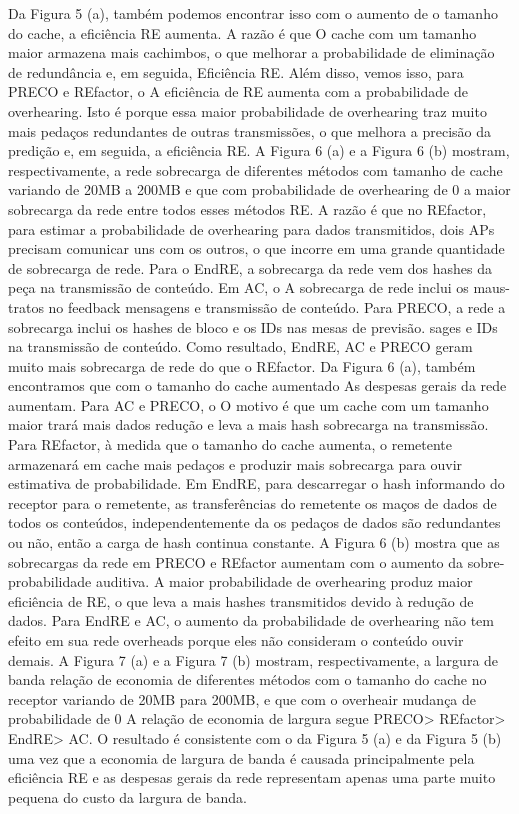 \documentclass[12pt]{article}
\begin{document}
\begin{enumerate}
\begin{enumerate}
		Da Figura 5 (a), também podemos encontrar isso com o aumento de
		o tamanho do cache, a eficiência RE aumenta. A razão é que
		O cache com um tamanho maior armazena mais cachimbos, o que
		melhorar a probabilidade de eliminação de redundância e, em seguida,
		Eficiência RE. Além disso, vemos isso, para PRECO e REfactor, o
		A eficiência de RE aumenta com a probabilidade de overhearing. Isto é
		porque essa maior probabilidade de overhearing traz muito mais
		pedaços redundantes de outras transmissões, o que melhora
		a precisão da predição e, em seguida, a eficiência RE.
		A Figura 6 (a) e a Figura 6 (b) mostram, respectivamente, a rede
		sobrecarga de diferentes métodos com tamanho de cache variando de
		20MB a 200MB e que com probabilidade de overhearing
		de 0%
		a maior sobrecarga da rede entre todos esses métodos RE.
		A razão é que no REfactor, para estimar a
		probabilidade de overhearing para dados transmitidos, dois APs precisam
		comunicar uns com os outros, o que incorre em uma grande quantidade de
		sobrecarga de rede. Para o EndRE, a sobrecarga da rede vem dos hashes da peça na transmissão de conteúdo. Em AC, o
		A sobrecarga de rede inclui os maus-tratos no feedback
		mensagens e transmissão de conteúdo. Para PRECO, a rede
		a sobrecarga inclui os hashes de bloco e os IDs nas mesas de previsão.
		sages e IDs na transmissão de conteúdo. Como resultado, EndRE, AC
		e PRECO geram muito mais sobrecarga de rede do que o REfactor.
		Da Figura 6 (a), também encontramos que com o tamanho do cache aumentado
		As despesas gerais da rede aumentam.
		Para AC e PRECO, o
		O motivo é que um cache com um tamanho maior trará mais dados
		redução e leva a mais hash sobrecarga na transmissão.
		Para REfactor, à medida que o tamanho do cache aumenta, o remetente armazenará em cache
		mais pedaços e produzir mais sobrecarga para ouvir
		estimativa de probabilidade. Em EndRE, para descarregar o hash
		informando do receptor para o remetente, as transferências do remetente
		os maços de dados de todos os conteúdos, independentemente da
		os pedaços de dados são redundantes ou não, então a carga de hash continua
		constante. A Figura 6 (b) mostra que as sobrecargas da rede em
		PRECO e REfactor aumentam com o aumento da sobre-
		probabilidade auditiva. A maior probabilidade de overhearing produz
		maior eficiência de RE, o que leva a mais hashes transmitidos
		devido à redução de dados. Para EndRE e AC, o aumento
		da probabilidade de overhearing não tem efeito em sua rede
		overheads porque eles não consideram o conteúdo ouvir demais.
		A Figura 7 (a) e a Figura 7 (b) mostram, respectivamente, a largura de banda
		relação de economia de diferentes métodos com o tamanho do cache no receptor
		variando de 20MB para 200MB, e que com o overheair
		mudança de probabilidade de 0%
		A relação de economia de largura segue PRECO> REfactor> EndRE> AC.
		O resultado é consistente com o da Figura 5 (a) e da Figura 5 (b)
		uma vez que a economia de largura de banda é causada principalmente pela eficiência RE
		e as despesas gerais da rede representam apenas uma parte muito pequena
		do custo da largura de banda.
		

\end{enumerate}
\end{enumerate}
\end{document}
